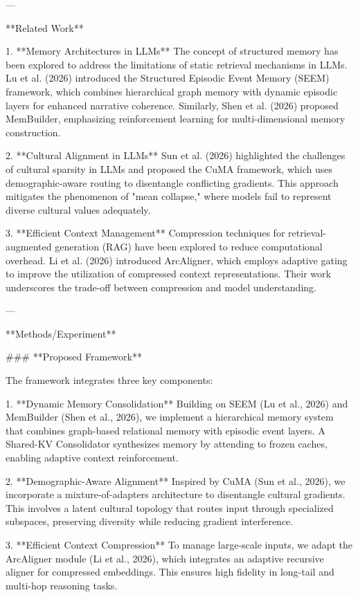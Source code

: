 ---

**Related Work**

1. **Memory Architectures in LLMs**  
The concept of structured memory has been explored to address the limitations of static retrieval mechanisms in LLMs. Lu et al. (2026) introduced the Structured Episodic Event Memory (SEEM) framework, which combines hierarchical graph memory with dynamic episodic layers for enhanced narrative coherence. Similarly, Shen et al. (2026) proposed MemBuilder, emphasizing reinforcement learning for multi-dimensional memory construction.

2. **Cultural Alignment in LLMs**  
Sun et al. (2026) highlighted the challenges of cultural sparsity in LLMs and proposed the CuMA framework, which uses demographic-aware routing to disentangle conflicting gradients. This approach mitigates the phenomenon of "mean collapse," where models fail to represent diverse cultural values adequately.

3. **Efficient Context Management**  
Compression techniques for retrieval-augmented generation (RAG) have been explored to reduce computational overhead. Li et al. (2026) introduced ArcAligner, which employs adaptive gating to improve the utilization of compressed context representations. Their work underscores the trade-off between compression and model understanding.

---

**Methods/Experiment**

### **Proposed Framework**

The framework integrates three key components:

1. **Dynamic Memory Consolidation**  
   Building on SEEM (Lu et al., 2026) and MemBuilder (Shen et al., 2026), we implement a hierarchical memory system that combines graph-based relational memory with episodic event layers. A Shared-KV Consolidator synthesizes memory by attending to frozen caches, enabling adaptive context reinforcement.

2. **Demographic-Aware Alignment**  
   Inspired by CuMA (Sun et al., 2026), we incorporate a mixture-of-adapters architecture to disentangle cultural gradients. This involves a latent cultural topology that routes input through specialized subspaces, preserving diversity while reducing gradient interference.

3. **Efficient Context Compression**  
   To manage large-scale inputs, we adapt the ArcAligner module (Li et al., 2026), which integrates an adaptive recursive aligner for compressed embeddings. This ensures high fidelity in long-tail and multi-hop reasoning tasks.

